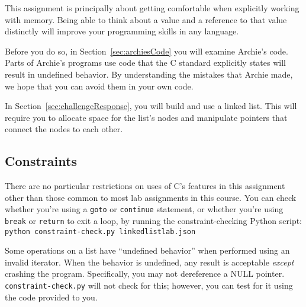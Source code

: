This assignment is principally about getting comfortable when explicitly working with memory.
Being able to think about a value and a reference to that value distinctly will improve your programming skills in any language.

Before you do so, in Section~\ref{sec:archiesCode} you will examine Archie's code.
Parts of Archie's programs use code that the C standard explicitly states will result in undefined behavior.
By understanding the mistakes that Archie made, we hope that you can avoid them in your own code.

In Section~\ref{sec:challengeResponse}, you will build and use a linked list.
This will require you to allocate space for the list's nodes and manipulate pointers that connect the nodes to each other.

\subsection{Constraints}

There are no particular restrictions on uses of C's features in this assignment other than those common to most lab assignments in this course.
    You can check whether you're using a \lstinline{goto} or \lstinline{continue} statement, or whether you're using \lstinline{break} or \lstinline{return} to exit a loop, by running the constraint-checking Python script:
    \texttt{python constraint-check.py linkedlistlab.json}

Some operations on a list have ``undefined behavior'' when performed using an invalid iterator.
When the behavior is undefined, any result is acceptable \textit{except} crashing the program.
Specifically, you may not dereference a NULL pointer.
\texttt{constraint-check.py} will not check for this; however, you can test for it using the code provided to you.
